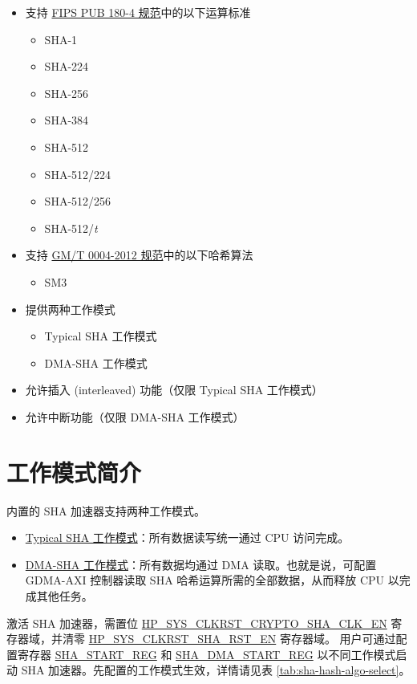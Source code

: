 \documentclass[main\_\_CN.tex]{subfiles}
\begin{document}
\begin{itemize}
    \item 支持 \href{https://doi.org/10.6028/NIST.FIPS.180-4}{FIPS PUB 180-4 规范}中的以下运算标准
    \begin{itemize}
        \item SHA-1
        \item SHA-224
        \item SHA-256
        \item SHA-384
        \item SHA-512
        \item SHA-512/224
        \item SHA-512/256
        \item SHA-512/{\it{t}}
    \end{itemize}
    \item 支持 \href{http://www.gmbz.org.cn/file/2018-01-08/6db059ec-61e1-4ff9-b112-ae15471ad6b5.PDF}{GM/T 0004-2012 规范}中的以下哈希算法
    \begin{itemize}
        \item SM3
    \end{itemize}
    \item 提供两种工作模式
    \begin{itemize}
        \item Typical SHA 工作模式
        \item DMA-SHA 工作模式
    \end{itemize}
    \item 允许插入 (interleaved) 功能（仅限 Typical SHA 工作模式）
    \item 允许中断功能（仅限 DMA-SHA 工作模式）
\end{itemize}

\section{工作模式简介}
\chipname{} 内置的 SHA 加速器支持两种工作模式。

\begin{itemize}
    \item \hyperref[sec:sha-typical-sha]{Typical SHA 工作模式}：所有数据读写统一通过 CPU 访问完成。
    \item \hyperref[sec:sha-dma-sha]{DMA-SHA 工作模式}：所有数据均通过 DMA 读取。也就是说，可配置 GDMA-AXI 控制器读取 SHA 哈希运算所需的全部数据，从而释放 CPU 以完成其他任务。
\end{itemize}

激活 SHA 加速器，需置位 \hyperref[fielddesc:HPSYSCLKRSTCRYPTOSHACLKEN]{HP\_SYS\_CLKRST\_CRYPTO\_SHA\_CLK\_EN} 寄存器域，并清零 \hyperref[fielddesc:HPSYSCLKRSTSHARSTEN]{HP\_SYS\_CLKRST\_SHA\_RST\_EN} 寄存器域。
用户可通过配置寄存器 \hyperref[regdesc:SHASTARTREG]{SHA\_START\_REG} 和 \hyperref[regdesc:SHADMASTARTREG]{SHA\_DMA\_START\_REG} 以不同工作模式启动 SHA 加速器。先配置的工作模式生效，详情请见表 \ref{tab:sha-hash-algo-select}。
\end{document}
